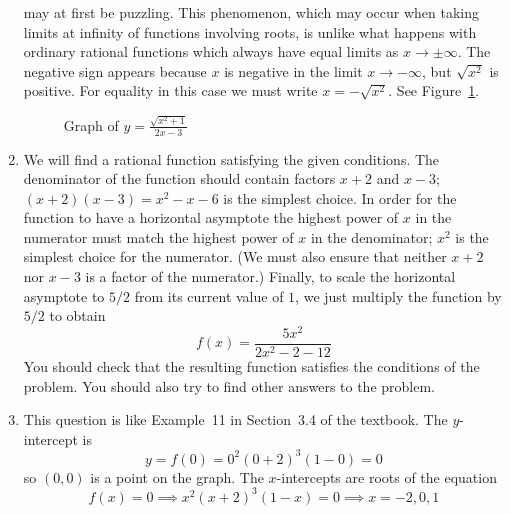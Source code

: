 \documentclass{article}
\newcommand{\ds}{\displaystyle}
\begin{document}
\begin{enumerate}
  may at first be puzzling.  This phenomenon, which may occur when
  taking limits at infinity of functions involving roots, is unlike
  what happens with ordinary rational functions which always have
  equal limits as $x\to \pm\infty$.  The negative sign appears because
  $x$ is negative in the limit $x\to -\infty$, but $\sqrt{x^2}$ is
  positive.  For equality in this case we must write $x=-\sqrt{x^2}$.
  See Figure~\ref{fig:sqrtlim}.
  \begin{figure}[htbp]
    \centering
    \caption{Graph of $\ds y=\frac{\sqrt{x^2+1}}{2x-3}$}
    \label{fig:sqrtlim}
  \end{figure}
\item %
  We will find a rational function satisfying the given conditions.
  The denominator of the function should contain factors $x+2$ and
  $x-3$; $(x+2)(x-3)=x^2-x-6$ is the simplest choice.  In order for
  the function to have a horizontal asymptote the highest power of $x$
  in the numerator must match the highest power of $x$ in the
  denominator; $x^2$ is the simplest choice for the numerator.  (We
  must also ensure that neither $x+2$ nor $x-3$ is a factor of the
  numerator.)  Finally, to scale the horizontal asymptote to $5/2$
  from its current value of $1$, we just multiply the function by
  $5/2$ to obtain
  \begin{displaymath}
    f(x) = \frac{5x^2}{2x^2-2-12}
  \end{displaymath}
  You should check that the resulting function satisfies the
  conditions of the problem.  You should also try to find other
  answers to the problem.
\item %
  This question is like Example~11 in Section~3.4 of the textbook.
  The $y$-intercept is
  \begin{displaymath}
    y=f(0) = 0^2(0+2)^3(1-0) = 0
  \end{displaymath}
  so $(0,0)$ is a point on the graph.  The $x$-intercepts are roots of
  the equation
  \begin{displaymath}
    f(x)=0 \implies x^2(x+2)^3(1-x)=0 \implies x=-2,0,1
  \end{displaymath}

\end{enumerate}
\end{document}
